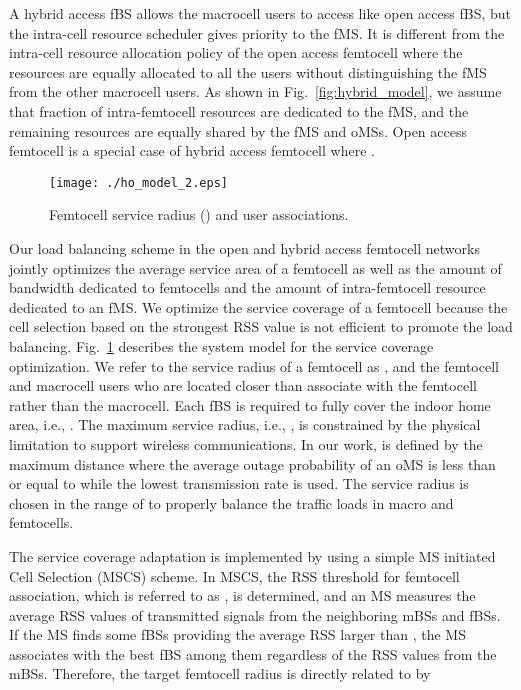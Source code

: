 \documentclass[journal]{IEEEtran}
\begin{document}
A hybrid access fBS allows the macrocell users to
access like open access fBS, but the intra-cell resource scheduler gives
priority to the fMS. It is different from the intra-cell resource allocation
policy of the open access femtocell where the resources are equally allocated to all the users
without distinguishing the fMS from the other macrocell users.
As shown in Fig.~\ref{fig:hybrid_model}, we assume that  fraction of intra-femtocell resources are
dedicated to the fMS, and the remaining resources are equally shared by the
fMS and oMSs. Open access femtocell is a special case of hybrid access femtocell where .

\begin{figure}
\begin{center}
\texttt{[image: ./ho\_model\_2.eps]}
\caption{Femtocell service radius () and user associations.}
\label{fig:ho_model}
\end{center}
\end{figure}
Our load balancing scheme in the open and hybrid access femtocell networks
jointly optimizes the average service area of a femtocell as well as the
amount of bandwidth dedicated to femtocells and the amount of intra-femtocell
resource dedicated to an fMS.
We
optimize the service coverage of a femtocell because
the cell selection based on the strongest RSS value is not efficient
to promote the load balancing.
Fig.~\ref{fig:ho_model} describes the system model for the service coverage optimization.
We refer to the service radius of a femtocell as , and the femtocell and macrocell
users who are located closer than  associate with the femtocell rather than
the macrocell.  Each fBS is required to fully cover the indoor home area, i.e., .
The maximum service radius, i.e., ,  is constrained by the physical limitation to support wireless communications. In our work,  is defined by the maximum distance where the average outage probability
of an oMS is less than or equal to  while the lowest transmission rate is used.
The service radius is chosen in the range of
 to properly balance the traffic loads in macro and femtocells.

The service coverage adaptation is implemented by using a simple  MS initiated Cell Selection (MSCS) scheme.
In MSCS, the RSS threshold for femtocell association, which is referred to as , is determined,
and an MS measures the average RSS values of transmitted signals from the neighboring mBSs and fBSs.
If the MS finds some fBSs providing the average RSS larger than , the MS associates with the best
fBS among them regardless of the RSS values from the mBSs.
Therefore, the target femtocell radius  is directly related to  by
\end{document}
